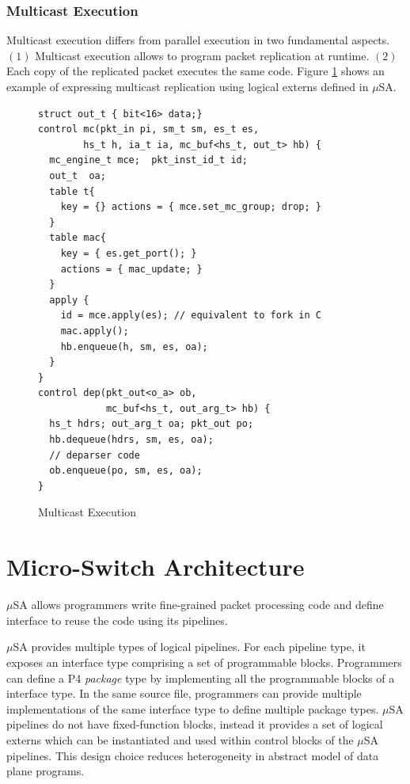 \documentclass{hotnets19}
\begin{document}
\subsubsection{Multicast Execution}
\label{subsubsection:multicast-execution}
Multicast execution differs from parallel execution in two fundamental aspects.
$(1)$ Multicast execution allows to program packet replication at runtime.
$(2)$ Each copy of the replicated packet executes the same code.
Figure \ref{fig:multicast-execution} shows an example of expressing multicast replication using logical externs defined in $\mu$SA.
\begin{figure}[ht]
\begin{lstlisting}[frame=none]
struct out_t { bit<16> data;}
control mc(pkt_in pi, sm_t sm, es_t es, 
        hs_t h, ia_t ia, mc_buf<hs_t, out_t> hb) {
  mc_engine_t mce;  pkt_inst_id_t id; 
  out_t  oa;
  table t{
    key = {} actions = { mce.set_mc_group; drop; }
  }
  table mac{
    key = { es.get_port(); } 
    actions = { mac_update; }
  }
  apply {
    id = mce.apply(es); // equivalent to fork in C
    mac.apply();
    hb.enqueue(h, sm, es, oa);
  }
}
control dep(pkt_out<o_a> ob, 
            mc_buf<hs_t, out_arg_t> hb) {
  hs_t hdrs; out_arg_t oa; pkt_out po;
  hb.dequeue(hdrs, sm, es, oa);
  // deparser code 
  ob.enqueue(po, sm, es, oa);
}
\end{lstlisting}
\caption{Multicast Execution}
\label{fig:multicast-execution}
\end{figure}

\section{Micro-Switch Architecture}
\label{section:micros-awitch-architecture}
$\mu$SA allows programmers write fine-grained packet processing code and define interface to reuse the code using its pipelines.

$\mu$SA provides multiple types of logical pipelines.
For each pipeline type, it exposes an interface type comprising a set of programmable blocks.
Programmers can define a P4 \emph{package} type by implementing all the programmable blocks of a interface type.
In the same source file, programmers can provide multiple implementations of the same interface type to define multiple package types.
$\mu$SA pipelines do not have fixed-function blocks, instead it provides a set of logical externs which can be instantiated and used within control blocks of the $\mu$SA pipelines.
This design choice reduces heterogeneity in abstract model of data plane programs.
\end{document}

